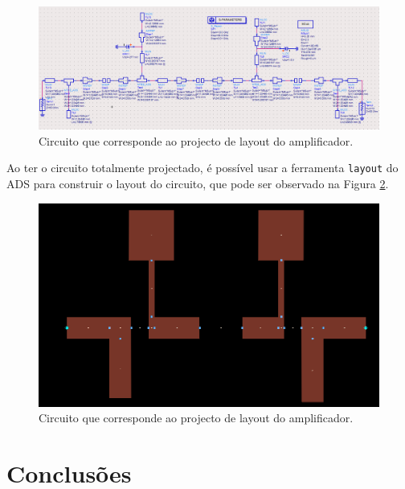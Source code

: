 \documentclass[11pt]{article}
\numberwithin{equation}{section}
\begin{document}
\begin{figure}[H]
	\centering
	\includegraphics[keepaspectratio=true, scale=0.45]{exps/Circuito_layout}
	\vspace{-0.5em}
	\caption{Circuito que corresponde ao projecto de layout do amplificador.}
	\vspace{-0.8em}
	\label{fig:Circuito_layout}
\end{figure}

Ao ter o circuito totalmente projectado, é possível usar a ferramenta \texttt{layout} do ADS para construir o layout do circuito, que pode ser observado na Figura \ref{fig:layout}.

\begin{figure}[H]
	\centering
	\includegraphics[keepaspectratio=true, scale=0.45]{exps/layout}
	\vspace{-0.5em}
	\caption{Circuito que corresponde ao projecto de layout do amplificador.}
	\vspace{-0.8em}
	\label{fig:layout}
\end{figure}

\section{Conclusões}
\end{document}
